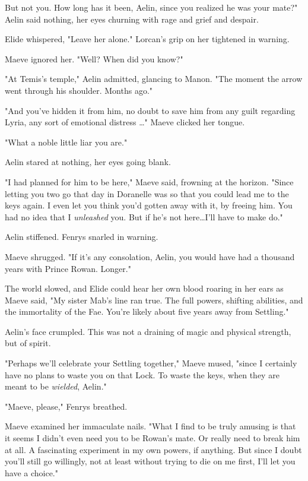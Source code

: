 But not you.
How long has it been, Aelin, since you realized he was your mate?"
Aelin said nothing, her eyes churning with rage and grief and despair.

Elide whispered, "Leave her alone."
Lorcan's grip on her tightened in warning.

Maeve ignored her.
"Well?
When did you know?"

"At Temis's temple," Aelin admitted, glancing to Manon.
"The moment the arrow went through his shoulder.
Months ago."

"And you've hidden it from him, no doubt to save him from any guilt regarding Lyria, any sort of emotional distress \ldots" Maeve clicked her tongue.

"What a noble little liar you are."

Aelin stared at nothing, her eyes going blank.

"I had planned for him to be here," Maeve said, frowning at the horizon.
"Since letting you two go that day in Doranelle was so that you could lead me to the keys again.
I even let you think you'd gotten away with it, by freeing him.
You had no idea that I \emph{unleashed}
you.
But if he's not here\ldots I'll have to make do."

Aelin stiffened.
Fenrys snarled in warning.

Maeve shrugged.
"If it's any consolation, Aelin, you would have had a thousand years with Prince Rowan.
Longer."

The world slowed, and Elide could hear her own blood roaring in her ears as Maeve said, "My sister Mab's line ran true.
The full powers, shifting abilities, and the immortality of the Fae.
You're likely about five years away from Settling."

Aelin's face crumpled.
This was not a draining of magic and physical strength, but of spirit.

"Perhaps we'll celebrate your Settling together," Maeve mused, "since I certainly have no plans to waste you on that Lock.
To waste the keys, when they are meant to be \emph{wielded}, Aelin."

"Maeve, please," Fenrys breathed.

Maeve examined her immaculate nails.
"What I find to be truly amusing is that it seems I didn't even need you to be Rowan's mate.
Or really need to break him at all.
A fascinating experiment in my own powers, if anything.
But since I doubt you'll still go willingly, not at least without trying to die on me first, I'll let you have a choice."

